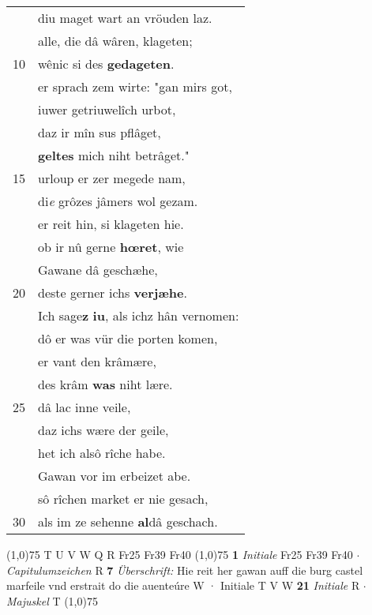 \documentclass[8pt,a4paper,notitlepage]{article}
\begin{document}
\begin{table}[ht]
\begin{minipage}[t]{0.5\linewidth}
\begin{tabular}{rl}
 & diu maget wart an vröuden laz.\\ 
 & alle, die dâ wâren, klageten;\\ 
10 & wênic si des \textbf{gedageten}.\\ 
 & er sprach zem wirte: "gan mirs got,\\ 
 & iuwer getriuwelîch urbot,\\ 
 & daz ir mîn sus pflâget,\\ 
 & \textbf{geltes} mich niht betrâget."\\ 
15 & urloup er zer megede nam,\\ 
 & di\textit{e} grôzes jâmers wol gezam.\\ 
 & er reit hin, si klageten hie.\\ 
 & ob ir nû gerne \textbf{hœret}, wie\\ 
 & Gawane dâ geschæhe,\\ 
20 & deste gerner ichs \textbf{verjæhe}.\\ 
 & Ich sage\textbf{z} \textbf{iu}, als ichz hân vernomen:\\ 
 & dô er was vür die porten komen,\\ 
 & er vant den krâmære,\\ 
 & des krâm \textbf{was} niht lære.\\ 
25 & dâ lac inne veile,\\ 
 & daz ichs wære der geile,\\ 
 & het ich alsô rîche habe.\\ 
 & Gawan vor im erbeizet abe.\\ 
 & sô rîchen market er nie gesach,\\ 
30 & als im ze sehenne \textbf{al}dâ geschach.\\ 
\end{tabular}
\scriptsize
\line(1,0){75} \newline
T U V W Q R Fr25 Fr39 Fr40 \newline
\line(1,0){75} \newline
\textbf{1} \textit{Initiale} Fr25 Fr39 Fr40   $\cdot$ \textit{Capitulumzeichen} R  \textbf{7} \textit{Überschrift:} Hie reit her gawan auff die burg castel marfeile vnd erstrait do die auenteúre W  · Initiale T V W  \textbf{21} \textit{Initiale} R   $\cdot$ \textit{Majuskel} T  \newline
\line(1,0){75} \newline

\end{minipage}
\end{table}
\end{document}
